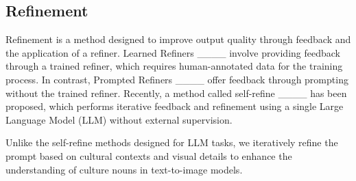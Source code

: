 \subsection{Refinement}
Refinement is a method designed to improve output quality through feedback and the application of a refiner. Learned Refiners ____ involve providing feedback through a trained refiner, which requires human-annotated data for the training process. In contrast, Prompted Refiners ____ offer feedback through prompting without the trained refiner. Recently, a method called self-refine ____ has been proposed, which performs iterative feedback and refinement using a single Large Language Model (LLM) without external supervision.

Unlike the self-refine methods designed for LLM tasks, we iteratively refine the prompt based on cultural contexts and visual details to enhance the understanding of culture nouns in text-to-image models.